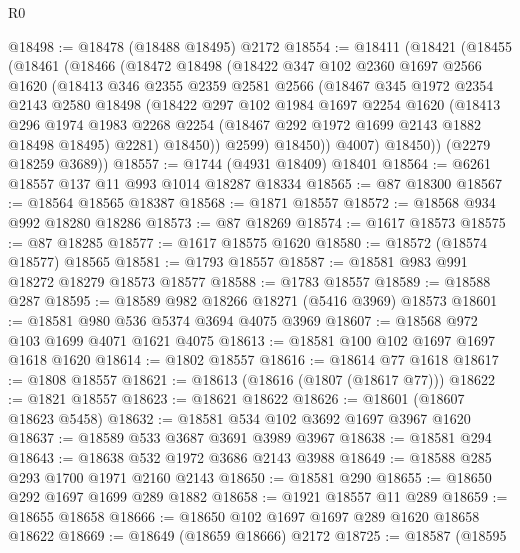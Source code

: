 \begin{lexlean}{R0}
\begin{coremodule}
@18498 := @18478 (@18488 @18495) @2172
@18554 := @18411
    (@18421
      (@18455
        (@18461
          (@18466
            (@18472
              @18498
              (@18422
                @347
                @102
                @2360
                @1697
                @2566
                @1620
                (@18413
                  @346
                  @2355
                  @2359
                  @2581
                  @2566
                  (@18467
                    @345
                    @1972
                    @2354
                    @2143
                    @2580
                    @18498
                    (@18422
                      @297
                      @102
                      @1984
                      @1697
                      @2254
                      @1620
                      (@18413
                        @296
                        @1974
                        @1983
                        @2268
                        @2254
                        (@18467 @292 @1972 @1699 @2143 @1882 @18498 @18495)
                        @2281)
                      @18450))
                  @2599)
                @18450))
            @4007)
          @18450))
      (@2279 @18259 @3689))
@18557 := @1744 (@4931 @18409) @18401
@18564 := @6261 @18557 @137 @11 @993 @1014 @18287 @18334
@18565 := @87 @18300
@18567 := @18564 @18565 @18387
@18568 := @1871 @18557
@18572 := @18568 @934 @992 @18280 @18286
@18573 := @87 @18269
@18574 := @1617 @18573
@18575 := @87 @18285
@18577 := @1617 @18575 @1620
@18580 := @18572 (@18574 @18577) @18565
@18581 := @1793 @18557
@18587 := @18581 @983 @991 @18272 @18279 @18573 @18577
@18588 := @1783 @18557
@18589 := @18588 @287
@18595 := @18589 @982 @18266 @18271 (@5416 @3969) @18573
@18601 := @18581 @980 @536 @5374 @3694 @4075 @3969
@18607 := @18568 @972 @103 @1699 @4071 @1621 @4075
@18613 := @18581 @100 @102 @1697 @1697 @1618 @1620
@18614 := @1802 @18557
@18616 := @18614 @77 @1618
@18617 := @1808 @18557
@18621 := @18613 (@18616 (@1807 (@18617 @77)))
@18622 := @1821 @18557
@18623 := @18621 @18622
@18626 := @18601 (@18607 @18623 @5458)
@18632 := @18581 @534 @102 @3692 @1697 @3967 @1620
@18637 := @18589 @533 @3687 @3691 @3989 @3967
@18638 := @18581 @294
@18643 := @18638 @532 @1972 @3686 @2143 @3988
@18649 := @18588 @285 @293 @1700 @1971 @2160 @2143
@18650 := @18581 @290
@18655 := @18650 @292 @1697 @1699 @289 @1882
@18658 := @1921 @18557 @11 @289
@18659 := @18655 @18658
@18666 := @18650 @102 @1697 @1697 @289 @1620 @18658 @18622
@18669 := @18649 (@18659 @18666) @2172
@18725 := @18587
    (@18595

\end{coremodule}
\end{lexlean}
